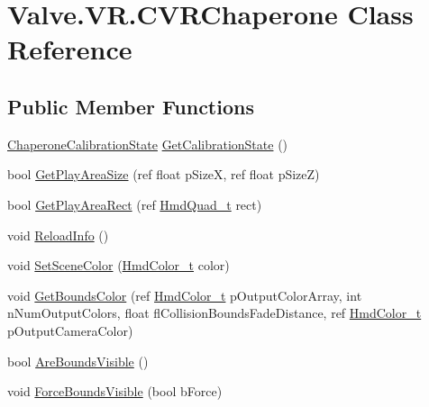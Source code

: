 \hypertarget{class_valve_1_1_v_r_1_1_c_v_r_chaperone}{}\section{Valve.\+V\+R.\+C\+V\+R\+Chaperone Class Reference}
\label{class_valve_1_1_v_r_1_1_c_v_r_chaperone}
\subsection*{Public Member Functions}
\begin{DoxyCompactItemize}
\item 
\mbox{\hyperlink{namespace_valve_1_1_v_r_ab893e8e2bf198a8cb4d2a2cd9c545c32}{Chaperone\+Calibration\+State}} \mbox{\hyperlink{class_valve_1_1_v_r_1_1_c_v_r_chaperone_a7607e48967a20187b75d52b0b1b04070}{Get\+Calibration\+State}} ()
\item 
bool \mbox{\hyperlink{class_valve_1_1_v_r_1_1_c_v_r_chaperone_a9f3098d79daba1782c0fa532b9332c27}{Get\+Play\+Area\+Size}} (ref float p\+SizeX, ref float p\+SizeZ)
\item 
bool \mbox{\hyperlink{class_valve_1_1_v_r_1_1_c_v_r_chaperone_a2cddb4abd411e2f7a63ac0312464adfc}{Get\+Play\+Area\+Rect}} (ref \mbox{\hyperlink{struct_valve_1_1_v_r_1_1_hmd_quad__t}{Hmd\+Quad\+\_\+t}} rect)
\item 
void \mbox{\hyperlink{class_valve_1_1_v_r_1_1_c_v_r_chaperone_afdb36eb8bc9ea53762ee6917b25f3c9b}{Reload\+Info}} ()
\item 
void \mbox{\hyperlink{class_valve_1_1_v_r_1_1_c_v_r_chaperone_ad3bb6c0d59497f0cb7d2d6073b977480}{Set\+Scene\+Color}} (\mbox{\hyperlink{struct_valve_1_1_v_r_1_1_hmd_color__t}{Hmd\+Color\+\_\+t}} color)
\item 
void \mbox{\hyperlink{class_valve_1_1_v_r_1_1_c_v_r_chaperone_a48e1cb9faace640582ef65e9e2414330}{Get\+Bounds\+Color}} (ref \mbox{\hyperlink{struct_valve_1_1_v_r_1_1_hmd_color__t}{Hmd\+Color\+\_\+t}} p\+Output\+Color\+Array, int n\+Num\+Output\+Colors, float fl\+Collision\+Bounds\+Fade\+Distance, ref \mbox{\hyperlink{struct_valve_1_1_v_r_1_1_hmd_color__t}{Hmd\+Color\+\_\+t}} p\+Output\+Camera\+Color)
\item 
bool \mbox{\hyperlink{class_valve_1_1_v_r_1_1_c_v_r_chaperone_a4330cb2ee583a6a60b828e219198b531}{Are\+Bounds\+Visible}} ()
\item 
void \mbox{\hyperlink{class_valve_1_1_v_r_1_1_c_v_r_chaperone_a02d54b6cb624de54d0766e1cf9a0d44f}{Force\+Bounds\+Visible}} (bool b\+Force)
\end{DoxyCompactItemize}


